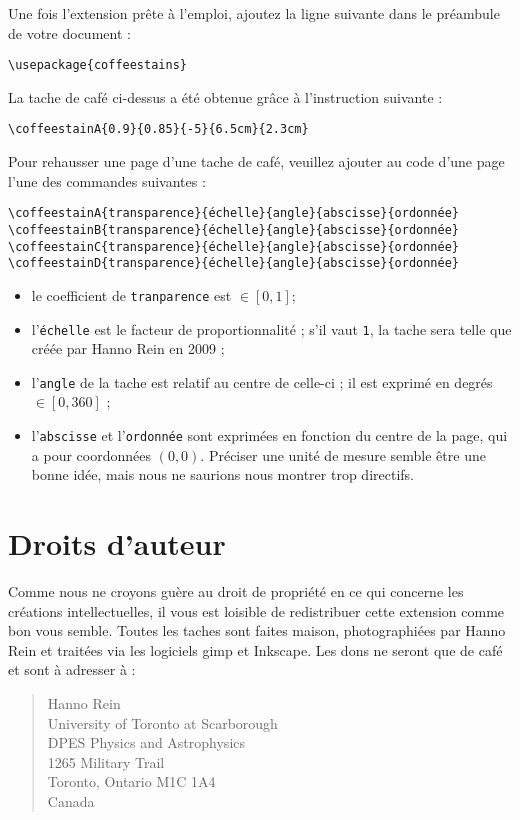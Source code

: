 \documentclass[a4paper, 11pt, BCOR = 0 pt, DIV = 13, oneside, french]{scrartcl}
\begin{document}
Une fois l'extension prête à l'emploi, ajoutez la ligne suivante dans le
préambule de votre document :
\begin{verbatim}
\usepackage{coffeestains}
\end{verbatim}
\vfill{}

\begin{tcolorbox}
  La tache de café ci-dessus a été obtenue grâce à l'instruction suivante :

  \verb|\coffeestainA{0.9}{0.85}{-5}{6.5cm}{2.3cm}|
\end{tcolorbox}
\newpage{}
\label{stainB}

Pour rehausser une page d'une tache de café, veuillez ajouter au code d'une page
l'une des commandes suivantes :
\begin{verbatim}
\coffeestainA{transparence}{échelle}{angle}{abscisse}{ordonnée}
\coffeestainB{transparence}{échelle}{angle}{abscisse}{ordonnée}
\coffeestainC{transparence}{échelle}{angle}{abscisse}{ordonnée}
\coffeestainD{transparence}{échelle}{angle}{abscisse}{ordonnée}
\end{verbatim}

\begin{itemize}
\item le coefficient de \texttt{tranparence} est $\in [0,1]$;
\item l'\texttt{échelle} est le facteur de proportionnalité ; s'il vaut \texttt{1},
  la tache sera telle que créée par Hanno Rein en 2009 ;
\item l'\texttt{angle} de la tache est relatif au centre de celle-ci ; il est exprimé en
  degrés $\in [0,360]$ ;
\item l'\texttt{abscisse} et l'\texttt{ordonnée} sont exprimées en
  fonction du centre de la page, qui a pour coordonnées $(0, 0)$. Préciser une
  unité de mesure semble être une bonne idée, mais nous ne saurions nous montrer
  trop directifs.
\end{itemize}

\section{Droits d'auteur}
Comme nous ne croyons guère au droit de propriété en ce qui concerne les
créations intellectuelles, il vous est loisible de redistribuer cette extension
comme bon vous semble. Toutes les taches sont faites maison, photographiées par
Hanno Rein et traitées via les logiciels gimp et Inkscape. Les dons ne seront
que de café et sont à adresser à :
\begin{quote}
Hanno Rein\\
University of Toronto at Scarborough\\
DPES Physics and Astrophysics\\
1265 Military Trail\\
Toronto, Ontario M1C 1A4\\
Canada
\end{quote}
\end{document}
